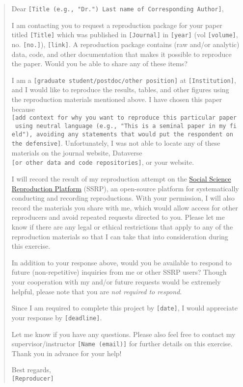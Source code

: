 \begin{quote}
Dear
\texttt{{[}Title\ (e.g.,\ "Dr.")\ Last\ name\ of\ Corresponding\ Author{]}},

I am contacting you to request a reproduction package for your paper
titled \texttt{{[}Title{]}} which was published in
\texttt{{[}Journal{]}} in \texttt{{[}year{]}} (vol
\texttt{{[}volume{]}}, no. \texttt{{[}no.{]}}), \texttt{{[}link{]}}. A
reproduction package contains (raw and/or analytic) data, code, and
other documentation that makes it possible to reproduce the paper. Would
you be able to share any of these items?

I am a \texttt{{[}graduate\ student/postdoc/other\ position{]}} at
\texttt{{[}Institution{]}}, and I would like to reproduce the results,
tables, and other figures using the reproduction materials mentioned
above. I have chosen this paper because
\texttt{{[}add\ context\ for\ why\ you\ want\ to\ reproduce\ this\ particular\ paper\ using\ neutral\ language\ (e.g.,\ "This\ is\ a\ seminal\ paper\ in\ my\ field"),\ avoiding\ any\ statements\ that\ would\ put\ the\ respondent\ on\ the\ defensive{]}}.
Unfortunately, I was not able to locate any of these materials on the
journal website, Dataverse
\texttt{{[}or\ other\ data\ and\ code\ repositories{]}}, or your
website.

I will record the result of my reproduction attempt on the
\href{https://www.socialsciencereproduction.org/}{Social Science
Reproduction Platform} (SSRP), an open-source platform for
systematically conducting and recording reproductions. With your
permission, I will also record the materials you share with me, which
would allow access for other reproducers and avoid repeated requests
directed to you. Please let me know if there are any legal or ethical
restrictions that apply to any of the reproduction materials so that I
can take that into consideration during this exercise.

In addition to your response above, would you be available to respond to
future (non-repetitive) inquiries from me or other SSRP users? Though
your cooperation with my and/or future requests would be extremely
helpful, please note that you are \textit{not required to respond}.

Since I am required to complete this project by \texttt{{[}date{]}}, I
would appreciate your response by \texttt{{[}deadline{]}}.

Let me know if you have any questions. Please also feel free to contact
my supervisor/instructor \texttt{{[}Name\ (email){]}} for further
details on this exercise. Thank you in advance for your help!

Best regards,\\
\texttt{{[}Reproducer{]}}
\end{quote}

